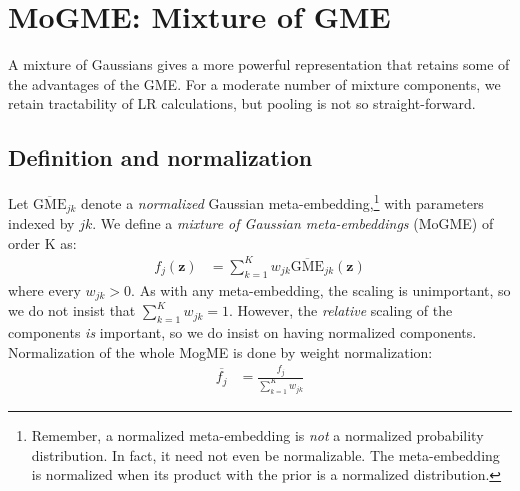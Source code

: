 \documentclass[a4paper,oneside,12pt,english]{report}
\def\zvec{\mathbf{z}}
\def\R{\mathbb{R}}
\def\normal#1{\overline{#1}}
\begin{document}
%
%

\section{MoGME: Mixture of GME}
\def\GME{\text{GME}}
\def\nGME{\normal{\GME}}
A mixture of Gaussians gives a more powerful representation that retains some of the advantages of the GME. For a moderate number of mixture components, we retain tractability of LR calculations, but pooling is not so straight-forward.

\subsection{Definition and normalization}
Let $\nGME_{jk}$ denote a \emph{normalized} Gaussian meta-embedding,\footnote{Remember, a normalized meta-embedding is \emph{not} a normalized probability distribution. In fact, it need not even be normalizable. The meta-embedding is normalized when its product with the prior is a normalized distribution.} with parameters indexed by $jk$. We define a \emph{mixture of Gaussian meta-embeddings} (MoGME) of order K as:
\begin{align}
f_j(\zvec) &= \sum_{k=1}^K w_{jk} \nGME_{jk}(\zvec)
\end{align} 
where every $w_{jk}>0$. As with any meta-embedding, the scaling is unimportant, so we do not insist that $\sum_{k=1}^Kw_{jk}=1$. However, the \emph{relative} scaling of the components \emph{is} important, so we do insist on having normalized components. Normalization of the whole MogME is done by weight normalization:
\begin{align}
\normal{f_j} &= \frac{f_j}{\sum_{k=1}^Kw_{jk}}
\end{align}
\end{document}
